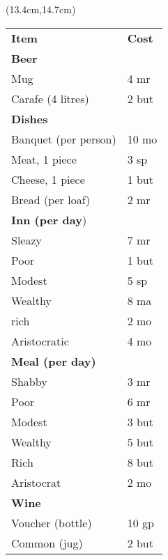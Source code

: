 \documentclass[a4paper,12 pt,openany]{book}
\begin{document}
\begin{textblock*}{12cm}
\end{textblock*}

\begin{textblock*}{6cm}(13.4cm,14.7cm) %

\begin{tabular}{ll}
\textbf{Item}&\textbf{Cost}\\
\textbf{Beer}&\\
Mug&4 mr\\
Carafe (4 litres)&2 but\\
\textbf{Dishes} &\\
Banquet (per person)&10 mo\\
Meat, 1 piece&3 sp\\
Cheese, 1 piece&1 but\\
Bread (per loaf)&2 mr\\
\textbf{Inn (per day})&\\
Sleazy&7 mr\\
Poor&1 but\\
Modest&5 sp\\
Wealthy&8 ma\\
rich&2 mo\\
Aristocratic&4 mo\\
\textbf{Meal (per day)}&\\
Shabby&3 mr\\
Poor&6 mr\\
Modest&3 but\\
Wealthy&5 but\\
Rich&8 but\\
Aristocrat&2 mo\\
\textbf{Wine}&\\
Voucher (bottle)&10 gp\\
Common (jug)&2 but\\
\end{tabular}

\end{textblock*}

~\newpage
\end{document}
